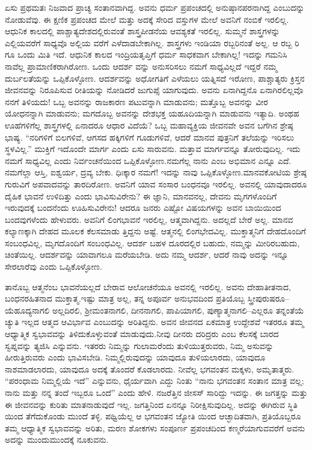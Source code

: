 ಏಸು ಪ್ರಥಮತಃ ನಿಜವಾದ ಪ್ರಾಚ್ಯ ಸಂತಾನವಾಗಿದ್ದ. ಅವನು ಧರ್ಮ ಪ್ರಪಂಚದಲ್ಲಿ ಅನುಷ್ಠಾನಪರನಾಗಿದ್ದ ಎಂಬುದನ್ನು ನೋಡುವೆವು. ಈ ಕ್ಷಣಿಕ ಪ್ರಪಂಚದ ಮೇಲೆ ಮತ್ತು ಅದಕ್ಕೆ ಸೇರಿದ ವಸ್ತುಗಳ ಮೇಲೆ ಅವನಿಗೆ ನಂಬಿಕೆ ಇರಲಿಲ್ಲ. ಆಧುನಿಕ ಕಾಲದಲ್ಲಿ ಪಾಶ್ಚಾತ್ಯದೇಶದಲ್ಲಿರುವಂತೆ ಶಾಸ್ತ್ರಪೀಡನೆಯ ಆವಶ್ಯಕತೆ ಇರಲಿಲ್ಲ. ಸುಮ್ಮನೆ ಶಾಸ್ತ್ರಗಳನ್ನು ಎಲ್ಲಿಯವರೆಗೆ ಸಾಧ್ಯವೊ ಅಲ್ಲಿಯ ವರೆಗೆ ಎಳೆದಾಡಬೇಕಾಗಿಲ್ಲ. ಶಾಸ್ತ್ರಗಳು ಇಂಡಿಯಾ ರಬ್ಬರಿನಂತೆ ಅಲ್ಲ. ಆ ರಬ್ಬ ರಿ ಗೂ ಒಂದು ಮಿತಿ ಇದೆ. ಆಧುನಿಕ ಕಾಲದ ಇಂದ್ರಿಯತೃಪ್ತಿಗೆ ಧರ್ಮ ಸಾಧಕವಾಗ ಬೇಕಾಗಿಲ್ಲ! ಇದನ್ನು ಗಮನಿಸಿ ನಾವೆಲ್ಲ ಪ್ರಾಮಾಣಿಕರಾಗಿರೋಣ. ಒಂದು ಆದರ್ಶ ವನ್ನು ಅನುಸರಿಸಲು ನಮಗೆ ಸಾಧ್ಯವಿಲ್ಲದೆ ಇದ್ದರೆ ನಮ್ಮ ದುರ್ಬಲತೆಯನ್ನು ಒಪ್ಪಿಕೊಳ್ಳೋಣ. ಆದರ್ಶವನ್ನು ಅಧೋಗತಿಗೆ ಎಳೆಯಲು ಯತ್ನಿಸದೆ ಇರೋಣ, ಪಾಶ್ಚಾತ್ಯರು ಕ್ರಿಸ್ತನ ಜೀವನವನ್ನು ನಿರೂಪಿಸುವ ರೀತಿಯನ್ನು ನೋಡಿದರೆ ಜುಗುಪ್ಸೆ ಯಾಗುವುದು. ಅವನು ಏನಾಗಿದ್ದನೊ ಏನಾಗಿರಲಿಲ್ಲವೊ ನನಗೆ ತಿಳಿಯದು! ಒಬ್ಬ ಅವನನ್ನು ರಾಜಕಾರಣ ಪಟುವನ್ನಾಗಿ ಮಾಡುವನು; ಮತ್ತೊಬ್ಬ ಅವನನ್ನು ವೀರ ಯೋಧನನ್ನಾಗಿ ಮಾಡುವನು; ಮಗದೊಬ್ಬ ಅವನನ್ನು ದೇಶಭಕ್ತ ಯಹೂದಿಯನ್ನಾಗಿ ಮಾಡುವನು ಇತ್ಯಾದಿ. ಅಂಥಹ ಊಹೆಗಳಿಗೆಲ್ಲ ಶಾಸ್ತ್ರಗಳಲ್ಲಿ ಏನಾದರೂ ಆಧಾರ ವಿದೆಯೆ? ಒಬ್ಬ ಮಹಾವ್ಯಕ್ತಿಯ ಜೀವನವೇ ಅವನ ಬಗೆಗಿನ ಶ್ರೇಷ್ಠ ಭಾಷ್ಯ. “ನರಿಗಳಿಗೆ ಬಿಲಗಳಿವೆ, ಆಗಸದ ಹಕ್ಕಿಗಳಿಗೆ ಗೂಡುಗಳಿವೆ, ಆದರೆ ಮಾನವ ಪುತ್ರನಿಗೆ ತಲೆಯನ್ನು ಇರಿಸಲು ಸ್ಥಳವಿಲ್ಲ.” ಮುಕ್ತಿಗೆ ಇದೊಂದೇ ಮಾರ್ಗ ಎಂದು ಏಸು ಸಾರುವನು. ಮತ್ತಾವ ಮಾರ್ಗವನ್ನೂ ತೋರುವುದಿಲ್ಲ. ಇದು ನಮಗೆ ಸಾಧ್ಯವಿಲ್ಲ ಎಂದು ನಿರ್ವಂಚನೆಯಿಂದ ಒಪ್ಪಿಕೊಳ್ಳೋಣ.ನಮಗೆಲ್ಲ ನಾನು ಎಂಬ ಅಭಿಮಾನ ಎನ್ನೂ ಎದೆ. ನಮಗೆಲ್ಲಾ ಆಸ್ತಿ, ಐಶ್ವರ್ಯ, ದ್ರವ್ಯ ಬೇಕು. ಧಿಃಕ್ಕಾರ ನಮಗೆ! ಇದನ್ನು ನಾವು ಒಪ್ಪಿಕೊಳ್ಳೋಣ.ಮಾನವಕೋಟಿಯ ಶ್ರೇಷ್ಠ ಗುರುವಿಗೆ ಅಪವಾದವನ್ನು ತಾರದಿರೋಣ. ಅವನಿಗೆ ಯಾವ ಸಂಸಾರ ಬಂಧನವೂ ಇರಲಿಲ್ಲ. ಅವನಲ್ಲಿ ಯಾವುದಾದರೂ ದೈಹಿಕ ಭಾವನೆ ಉಳಿದಿತ್ತು ಎಂದು ಭಾವಿಸುವಿರೇನು? ಈ ಜ್ಞಾನಿ, ಮಾನವನಲ್ಲ, ದೇವನು ಮೃಗಗಳೊಂದಿಗೆ ಇರುವುದಕ್ಕೆ ಬಂದನೆಂದು ಊಹಿಸುವಿರೇನು! ಆದರೂ ಜನರು ಎಷ್ಟೋ ವಿಷಯಗಳನ್ನು ಅವನ ಬಾಯಿಯಿಂದ ಬಂದವುಗಳೆಂದು ಹೇಳುವರು. ಅವನಿಗೆ ಲಿಂಗಭಾವನೆ ಇರಲಿಲ್ಲ, ಆತ್ಮವಾಗಿದ್ದನು. ಅದಲ್ಲದೆ ಬೇರೆ ಅಲ್ಲ. ಮಾನವ ಕಲ್ಯಾಣಕ್ಕಾಗಿ ದೇಹದ ಮೂಲಕ ಕೆಲಸಮಾಡು ತ್ತಿದ್ದನು ಅಷ್ಟೆ. ಆತ್ಮನಲ್ಲಿ ಲಿಂಗಭೇದವಿಲ್ಲ. ಮುಕ್ತಾತ್ಮನಿಗೆ ದೇಹದೊಂದಿಗೆ ಸಂಬಂಧವಿಲ್ಲ, ಮೃಗದೊಂದಿಗೆ ಸಂಬಂಧವಿಲ್ಲ. ಆದರ್ಶ ಬಹಳ ದೂರದಲ್ಲಿರ ಬಹುದು, ನಮ್ಮನ್ನು ಮೀರಿರಬಹುದು, ಚಿಂತೆಯಿಲ್ಲ. ಆದರ್ಶವನ್ನು ಯಾವಾಗಲೂ ಮರೆಯಬೇಡಿ. ಅದು ನಮ್ಮ ಆದರ್ಶ, ಆದರೆ ನಾವು ಅದನ್ನು ಇನ್ನೂ ಸೇರಲಾರೆವು ಎಂದು ಒಪ್ಪಿಕೊಳ್ಳೋಣ.

ತಾನೊಬ್ಬ ಆತ್ಮನೆಂಬ ಭಾವನೆಯಲ್ಲದೆ ಬೇರಾವ ಆಲೋಚನೆಯೂ ಅವನಲ್ಲಿ ಇರಲಿಲ್ಲ. ಅವನು ದೇಹಾತೀತನಾದ, ಬಂಧನರಹಿತನಾದ ಮುಕ್ತಾತ್ಮ.ಇಷ್ಟು ಮಾತ್ರ ಅಲ್ಲ, ತನ್ನ ಅಪೂರ್ವ ಅನುಭವದಿಂದ ಪ್ರತಿಯೊಬ್ಬ ಸ್ತ್ರೀಪುರುಷರೂ– ಯೆಹೂದ್ಯನಾಗಲಿ ಅಲ್ಲದಿರಲಿ, ಶ‍್ರೀಮಂತನಾಗಲಿ, ದೀನನಾಗಲಿ, ಪಾಪಿಯಾಗಲಿ, ಪುಣ್ಯಾತ್ಮನಾಗಲಿ–ಎಲ್ಲರೂ ತನ್ನಂತೆಯೆ ಚ್ಯುತಿ ಇಲ್ಲದ ಆತ್ಮದ ಆವಿರ್ಭಾವ ಎಂಬುದನ್ನು ಅರಿತಿದ್ದನು. ಅವನ ಜೀವನದ ಏಕಮಾತ್ರ ಉದ್ದೇಶವೆ ಇತರರೂ ತಮ್ಮ ಆಧ್ಯಾತ್ಮಿಕ ಸ್ವಭಾವವನ್ನು ತಿಳಿದುಕೊಳ್ಳುವಂತೆ ಮಾಡುವುದು.ನೀವು ದೀನರು ದರಿದ್ರರು ಎಂಬ ಕೆಲಸಕ್ಕೆ ಬಾರದ ಸ್ವಪ್ನವನ್ನು ತ್ಯಜಿಸಿ ಎನ್ನುವನು. ಇತರರು ನಿಮ್ಮನ್ನು ಗುಲಾಮರೆಂದು ತುಳಿಯುತ್ತರುವರು, ನಿಮ್ಮ ಅಸುವನ್ನು ಹೀರುತ್ತಿರುವರು ಎಂದು ಭಾವಿಸಬೇಡಿ. ನಿಮ್ಮಲ್ಲಿರುವುದನ್ನು ಯಾವುದೂ ತುಳಿಯಲಾರದು, ಯಾವುದೂ ನಾಶಮಾಡಲಾರದು, ಯಾವುದೂ ಅದಕ್ಕೆ ತೊಂದರೆ ಕೊಡಲಾರದು. ನೀವೆಲ್ಲ ಭಗವಂತನ ಮಕ್ಕಳು, ಅಮೃತಾತ್ಮರು. “ಪರಂಧಾಮ ನಿಮ್ಮಲ್ಲಿಯೆ ಇದೆ” ಎನ್ನುವನು, ಧೈರ್ಯವಾಗಿ ಎದ್ದು ನಿಂತು “ನಾನು ಭಗವಂತನ ಸಂತಾನ ಮಾತ್ರ ವಲ್ಲ; ನಾನು ಮತ್ತು ನನ್ನ ತಂದೆ ಇಬ್ಬರೂ ಒಂದೆ” ಎಂದು ಹೇಳಿ. ನಜರೆತ್ತಿನ ಜೀಸಸ್​ ಸಾರಿದ್ದು ಇದನ್ನು. ಈ ಜಗತ್ತನ್ನು ಮತ್ತು ಈ ಜೀವನವನ್ನು ಕುರಿತು ಮಾತನಾಡುವುದೆ ಇಲ್ಲ. ಜಗತ್ತಿನಿಂದ ಏನನ್ನೂ ನಿರೀಕ್ಷಿಸುವುದಿಲ್ಲ. ಅದನ್ನು ಈಗಿರುವ ಸ್ಥಿತಿ ಯಿಂದ ತೆಗೆದುಕೊಂಡು ಮುಂದೆ ತಳ್ಳಿ. ಪಥ್ವಿಯೆಲ್ಲ ಆ ಭಗವಂತನ ಜ್ಯೋತಿ ಯಿಂದ ಆಚ್ಛಾದಿತವಾಗಿ, ಪ್ರತಿಯೊಬ್ಬರೂ ತಮ್ಮ ಆಧ್ಯಾತ್ಮಿಕ ಸ್ವಭಾವವನ್ನು ಅರಿತು, ಮರಣ ಶೋಕಗಳು ಸಂಪೂರ್ಣ ಪ್ರಪಂಚದಿಂದ ಕಣ್ಮರೆಯಾಗುವವರೆಗೆ ಅವನು ಅದನ್ನು ಮುಂದುಮುಂದಕ್ಕೆ ನೂಕುವನು.

